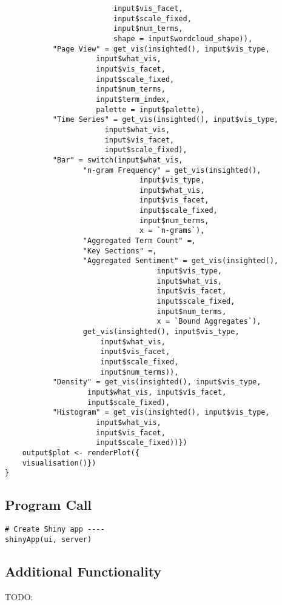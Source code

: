 \documentclass[a4paper, 11pt]{article}
\begin{document}
\begin{verbatim}
					     input$vis_facet,
					     input$scale_fixed,
					     input$num_terms,
					     shape = input$wordcloud_shape)),
	       "Page View" = get_vis(insighted(), input$vis_type,
				     input$what_vis,
				     input$vis_facet,
				     input$scale_fixed,
				     input$num_terms,
				     input$term_index,
				     palette = input$palette),
	       "Time Series" = get_vis(insighted(), input$vis_type,
				       input$what_vis,
				       input$vis_facet,
				       input$scale_fixed),
	       "Bar" = switch(input$what_vis,
			      "n-gram Frequency" = get_vis(insighted(),
							   input$vis_type,
							   input$what_vis,
							   input$vis_facet,
							   input$scale_fixed,
							   input$num_terms,
							   x = `n-grams`),
			      "Aggregated Term Count" =,
			      "Key Sections" =,
			      "Aggregated Sentiment" = get_vis(insighted(),
							       input$vis_type,
							       input$what_vis,
							       input$vis_facet,
							       input$scale_fixed,
							       input$num_terms,
							       x = `Bound Aggregates`),
			      get_vis(insighted(), input$vis_type,
				      input$what_vis,
				      input$vis_facet,
				      input$scale_fixed,
				      input$num_terms)),
	       "Density" = get_vis(insighted(), input$vis_type,
				   input$what_vis, input$vis_facet,
				   input$scale_fixed),
	       "Histogram" = get_vis(insighted(), input$vis_type,
				     input$what_vis,
				     input$vis_facet,
				     input$scale_fixed))})
    output$plot <- renderPlot({
	visualisation()})
}
\end{verbatim}

\subsection{Program Call}
\label{sec:org5daa1f7}

\begin{verbatim}
# Create Shiny app ----
shinyApp(ui, server)
\end{verbatim}

\subsection{Additional Functionality}
\label{sec:org09c75c1}
TODO:
\end{document}
